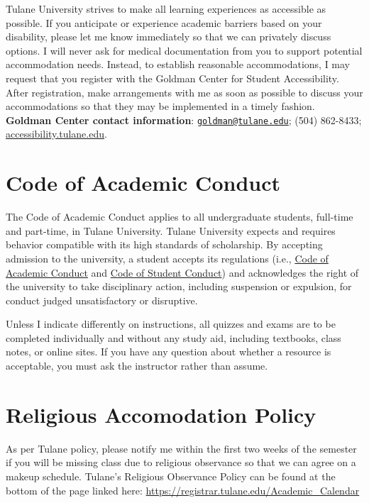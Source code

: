 \documentclass[
  11pt,
]{article}
\begin{document}
Tulane University strives to make all learning experiences as accessible
as possible. If you anticipate or experience academic barriers based on
your disability, please let me know immediately so that we can privately
discuss options. I will never ask for medical documentation from you to
support potential accommodation needs. Instead, to establish reasonable
accommodations, I may request that you register with the Goldman Center
for Student Accessibility. After registration, make arrangements with me
as soon as possible to discuss your accommodations so that they may be
implemented in a timely fashion. \textbf{Goldman Center contact
information}:
\href{mailto:goldman@tulane.edu}{\nolinkurl{goldman@tulane.edu}}; (504)
862-8433;
\href{https://accessibility.tulane.edu/}{accessibility.tulane.edu}.

\hypertarget{code-of-academic-conduct}{%
\section{Code of Academic Conduct}\label{code-of-academic-conduct}}

The Code of Academic Conduct applies to all undergraduate students,
full-time and part-time, in Tulane University. Tulane University expects
and requires behavior compatible with its high standards of scholarship.
By accepting admission to the university, a student accepts its
regulations (i.e.,
\href{https://college.tulane.edu/academics/academic-integrity/code-of-academic-conduct}{Code
of Academic Conduct} and
\href{https://conduct.tulane.edu/resources/code-student-conduct}{Code of
Student Conduct}) and acknowledges the right of the university to take
disciplinary action, including suspension or expulsion, for conduct
judged unsatisfactory or disruptive.

Unless I indicate differently on instructions, all quizzes and exams are
to be completed individually and without any study aid, including
textbooks, class notes, or online sites. If you have any question about
whether a resource is acceptable, you must ask the instructor rather
than assume.

\hypertarget{religious-accomodation-policy}{%
\section{Religious Accomodation
Policy}\label{religious-accomodation-policy}}

As per Tulane policy, please notify me within the first two weeks of the
semester if you will be missing class due to religious observance so
that we can agree on a makeup schedule. Tulane's Religious Observance
Policy can be found at the bottom of the page linked here:
\url{https://registrar.tulane.edu/Academic_Calendar}
\end{document}
